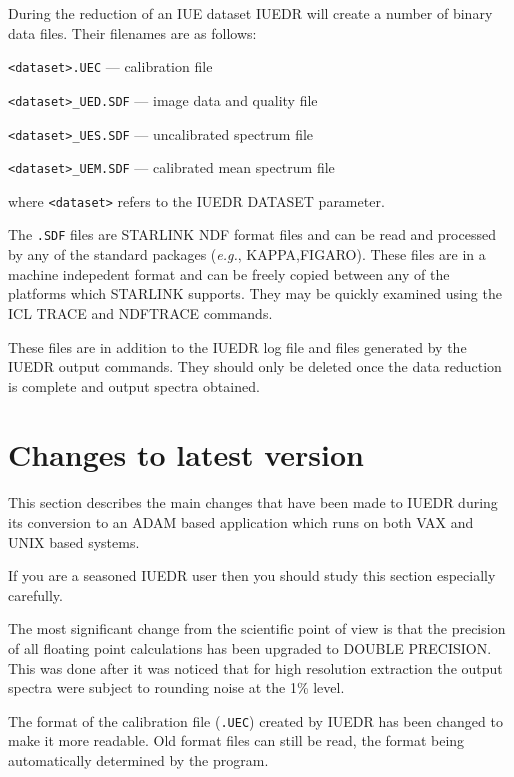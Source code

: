 During the reduction of an IUE dataset IUEDR will create a number of
binary data files. Their filenames are as follows:

\begin {description}
\item \verb+<dataset>.UEC+ --- calibration file
\item \verb+<dataset>_UED.SDF+ --- image data and quality file
\item \verb+<dataset>_UES.SDF+ --- uncalibrated spectrum file
\item \verb+<dataset>_UEM.SDF+ --- calibrated mean spectrum file
\end {description}

where \verb+<dataset>+ refers to the IUEDR DATASET parameter.

The {\tt .SDF} files are STARLINK NDF format files and can be read and
processed by any of the standard  packages ({\em e.g.}, KAPPA,FIGARO).
These files are in a machine indepedent format and can be freely
copied between any of the platforms which STARLINK supports. They may
be quickly examined using the ICL TRACE and NDFTRACE commands.

These files are in addition to the IUEDR log file and files generated
by the  IUEDR output commands. They should only be deleted once the
data reduction is complete and output  spectra obtained.

\newpage

\section{Changes to latest version}

This section describes the main changes that have been made to IUEDR
during its conversion to an ADAM based application which runs on both
VAX and UNIX based systems.

If you are a seasoned IUEDR user then you should study this section
especially carefully.

The most significant change from the scientific point of view is that 
the precision of all floating point calculations has been upgraded to
DOUBLE PRECISION. This was done after it was noticed that for high
resolution extraction the output spectra were subject to rounding
noise at the 1\% level.

The format of the calibration file ({\tt .UEC}) created by IUEDR has
been  changed to make it more readable. Old format files can still be 
read, the format being automatically determined by the program.

